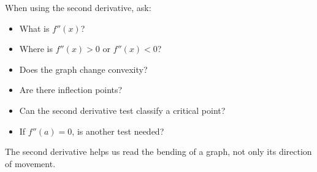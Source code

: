 \begin{summarybox}
When using the second derivative, ask:
\begin{itemize}
\item What is \(f''(x)\)?
\item Where is \(f''(x)>0\) or \(f''(x)<0\)?
\item Does the graph change convexity?
\item Are there inflection points?
\item Can the second derivative test classify a critical point?
\item If \(f''(a)=0\), is another test needed?
\end{itemize}
\end{summarybox}

The second derivative helps us read the bending of a graph, not only its direction of movement.
